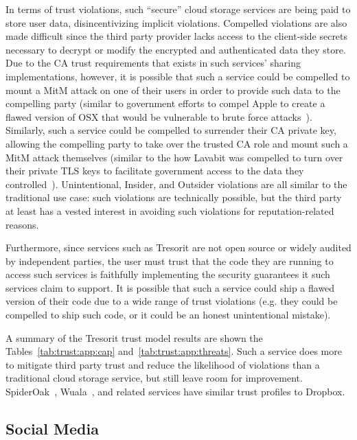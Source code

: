 In terms of trust violations, such ``secure'' cloud storage services
are being paid to store user data, disincentivizing implicit
violations. Compelled violations are also made difficult since the
third party provider lacks access to the client-side secrets necessary
to decrypt or modify the encrypted and authenticated data they
store. Due to the CA trust requirements that exists in such services'
sharing implementations, however, it is possible that such a service
could be compelled to mount a MitM attack on one of their users in
order to provide such data to the compelling party (similar to
government efforts to compel Apple to create a flawed version of OSX
that would be vulnerable to brute force
attacks~\cite{ars-cookvfbi}). Similarly, such a service could be
compelled to surrender their CA private key, allowing the compelling
party to take over the trusted CA role and mount such a MitM attack
themselves (similar to the how Lavabit was compelled to turn over
their private TLS keys to facilitate government access to the data
they controlled~\cite{levsion-lavabit}). Unintentional, Insider, and
Outsider violations are all similar to the traditional use case: such
violations are technically possible, but the third party at least has
a vested interest in avoiding such violations for reputation-related
reasons.

Furthermore, since services such as Tresorit are not open source or
widely audited by independent parties, the user must trust that the
code they are running to access such services is faithfully
implementing the security guarantees it such services claim to
support. It is possible that such a service could ship a flawed
version of their code due to a wide range of trust violations
(e.g. they could be compelled to ship such code, or it could be an
honest unintentional mistake).

A summary of the Tresorit trust model results are shown the
Tables~\ref{tab:trust:app:cap} and~\ref{tab:trust:app:threats}. Such a
service does more to mitigate third party trust and reduce the
likelihood of violations than a traditional cloud storage service, but
still leave room for improvement. SpiderOak~\cite{spideroak},
Wuala~\cite{wuala}, and related services have similar trust profiles
to Dropbox.

\subsection{Social Media}

